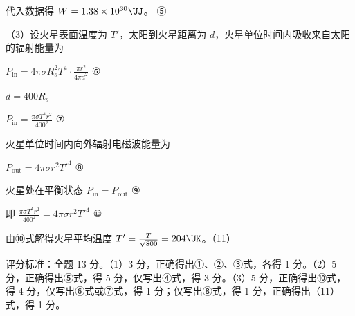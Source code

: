 \documentclass[\gkver]{gaokaozhenti}
\begin{document}
\begin{enumerate}
{代入数据得 $W=1.38\times10^{30}\UJ$。 ⑤

（3）设火星表面温度为 $T'$，太阳到火星距离为 $d$，火星单位时间内吸收来自太阳的辐射能量为

$P_{\text{in}}=4\pi\sigma R_{s}^{2}T^{4}\cdot\frac{\pi r^{2}}{4\pi d^{2}}$ ⑥

$d=400R_{s}$

$P_{\text{in}}=\frac{\pi\sigma T^{4}r^{2}}{400^{2}}$ ⑦

火星单位时间内向外辐射电磁波能量为

$P_{\text{out}}=4\pi\sigma r^{2}T'^{4}$ ⑧

火星处在平衡状态 $P_{\text{in}}=P_{\text{out}}$ ⑨

即 $\frac{\pi\sigma T^{4}r^{2}}{400^{2}}=4\pi\sigma r^{2}T'^{4}$ ⑩

由⑩式解得火星平均温度 $T'=\frac{T}{\sqrt{800}}=204\UK$。（11）

评分标准：全题 13 分。（1）3 分，正确得出①、②、③式，各得 1 分。（2）5 分，正确得出⑤式，得 5 分，仅写出④式，得 3 分。（3）5 分，正确得出⑩式，得 4 分，仅写出⑥式或⑦式，得 1 分；仅写出⑧式，得 1 分，正确得出（11）式，得 1 分。
}

\end{enumerate}
\end{document}
